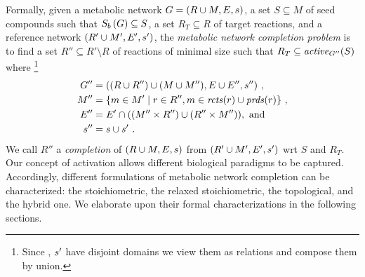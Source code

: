 Formally, given
a metabolic network $G=(R\cup M,E,s)$, %
a set $S\subseteq M$ of seed compounds such that $S_{b}\,(G) \subseteq S$,
a set $R_{T}\subseteq R$ of target reactions, and
a reference network $(R'\cup M',E',s')$,
%
the \emph{metabolic network completion problem} is to find a set $R''\subseteq R'\setminus R$ of reactions of minimal size such that
\(
R_{T}\subseteq\mathit{active}_{G''}(S)
\)
where%
\footnote{Since \StoichiometricFunction, $s'$ have disjoint domains we view them as relations and compose them by union.}
\begin{align}
  \label{eq:completion:graph}
  G''&= ((R\cup R'')\cup (M\cup M''),E\cup E'',\StoichiometricFunction'')\ ,
  \\\label{eq:completion:metabolites}
  M''&=\{m\in M'\mid r\in R'', m\in\Reactants{r}\cup\Products{r}\}\ ,
  \\\label{eq:completion:edges}
  E''&=E'\cap((M''\times R'')\cup(R''\times M'')) , \text{ and}
  \\
  \StoichiometricFunction''&=\StoichiometricFunction\cup\StoichiometricFunction'
  \ .
\end{align}
%
We call $R''$ a \emph{completion} of $(R\cup M,E,s)$ from $(R'\cup M',E',s')$ wrt $S$ and $R_{T}$.
%
Our concept of activation allows different biological paradigms to be captured.
%
Accordingly,
different formulations of metabolic network completion can be characterized:
the stoichiometric, the relaxed stoichiometric, the topological, and the hybrid one.
We elaborate upon their formal characterizations in the following sections.

